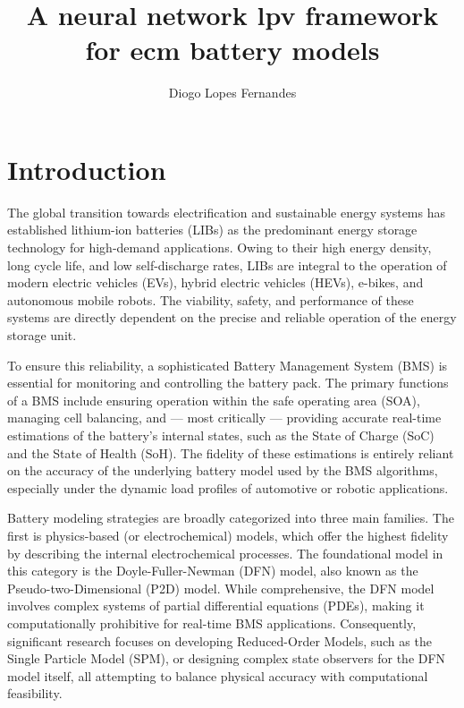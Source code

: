 \documentclass[lettersize,journal]{IEEEtran}
\title{A neural network lpv framework for ecm battery models}
\author{Diogo Lopes Fernandes}
\begin{document}
\maketitle

\begin{abstract}

\end{abstract}

\section{Introduction}

The global transition towards electrification and sustainable energy systems has established lithium-ion batteries (LIBs) as the predominant energy storage technology for high-demand applications. Owing to their high energy density, long cycle life, and low self-discharge rates, LIBs are integral to the operation of modern electric vehicles (EVs), hybrid electric vehicles (HEVs), e-bikes, and autonomous mobile robots\cite{mawuntu2023modeling}. The viability, safety, and performance of these systems are directly dependent on the precise and reliable operation of the energy storage unit.

To ensure this reliability, a sophisticated Battery Management System (BMS) is essential for monitoring and controlling the battery pack\cite{tekin2024comparative}. The primary functions of a BMS include ensuring operation within the safe operating area (SOA), managing cell balancing, and — most critically — providing accurate real-time estimations of the battery's internal states, such as the State of Charge (SoC) and the State of Health (SoH)\cite{damodaran2024fast}. The fidelity of these estimations is entirely reliant on the accuracy of the underlying battery model used by the BMS algorithms\cite{tran2021comprehensive}, especially under the dynamic load profiles of automotive or robotic applications.

Battery modeling strategies are broadly categorized into three main families. The first is physics-based (or electrochemical) models, which offer the highest fidelity by describing the internal electrochemical processes. The foundational model in this category is the Doyle-Fuller-Newman (DFN) model, also known as the Pseudo-two-Dimensional (P2D) model\cite{piruzjam2024analytical}. While comprehensive, the DFN model involves complex systems of partial differential equations (PDEs), making it computationally prohibitive for real-time BMS applications\cite{khalik2021model}. Consequently, significant research focuses on developing Reduced-Order Models, such as the Single Particle Model (SPM)\cite{li2018single, piruzjam2024analytical}, or designing complex state observers for the DFN model itself\cite{drummond2019observer}, all attempting to balance physical accuracy with computational feasibility.
\end{document}
